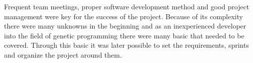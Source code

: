Frequent team meetings, proper software development method and good project management were key for the success of the project.
Because of its complexity there were many unknowns in the beginning and as an inexperienced developer into the field of genetic
programming there were many basic that needed to be covered. Through this basic it was later possible to set the requirements,
sprints and organize the project around them.
